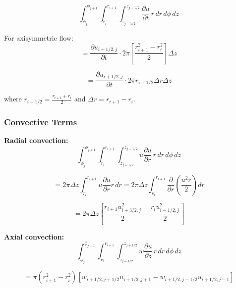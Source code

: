 \begin{equation}
    \int_{\phi_j}^{\phi_{j+1}} \int_{r_{i}}^{r_{i+1}} \int_{z_{j-1/2}}^{z_{j+1/2}} \frac{\partial u}{\partial t} \, r\,dr\,d\phi\,dz
\end{equation}

For axisymmetric flow:
\begin{equation}
    = \frac{\partial u_{i+1/2,j}}{\partial t} \cdot 2\pi \left[\frac{r_{i+1}^2 - r_i^2}{2}\right] \Delta z
\end{equation}

\begin{equation}
    \boxed{= \frac{\partial u_{i+1/2,j}}{\partial t} \cdot 2\pi r_{i+1/2} \Delta r \Delta z}
\end{equation}

where $r_{i+1/2} = \frac{r_{i+1} + r_i}{2}$ and $\Delta r = r_{i+1} - r_i$.

\subsubsection{Convective Terms}

\textbf{Radial convection:}
\begin{equation}
    \int_{\phi_j}^{\phi_{j+1}} \int_{r_{i}}^{r_{i+1}} \int_{z_{j-1/2}}^{z_{j+1/2}} u\frac{\partial u}{\partial r} \, r\,dr\,d\phi\,dz
\end{equation}

\begin{equation}
    = 2\pi \Delta z \int_{r_i}^{r_{i+1}} u\frac{\partial u}{\partial r} r\,dr = 2\pi \Delta z \int_{r_i}^{r_{i+1}} \frac{\partial}{\partial r}\left(\frac{u^2 r}{2}\right) dr
\end{equation}

\begin{equation}
    \boxed{= 2\pi \Delta z \left[\frac{r_{i+1} u_{i+3/2,j}^2}{2} - \frac{r_i u_{i-1/2,j}^2}{2}\right]}
\end{equation}

\textbf{Axial convection:}
\begin{equation}
    \int_{\phi_j}^{\phi_{j+1}} \int_{r_{i}}^{r_{i+1}} \int_{z_{j-1/2}}^{z_{j+1/2}} w\frac{\partial u}{\partial z} \, r\,dr\,d\phi\,dz
\end{equation}

\begin{equation}
    \boxed{= \pi(r_{i+1}^2 - r_i^2) \left[w_{i+1/2,j+1/2} u_{i+1/2,j+1} - w_{i+1/2,j-1/2} u_{i+1/2,j-1}\right]}
\end{equation}

